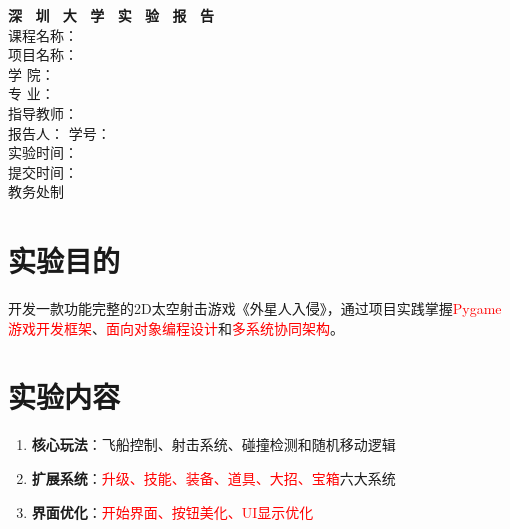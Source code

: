 \documentclass[a4paper,12pt]{article}
\begin{document}

\begin{titlepage}
    \centering
    \vspace*{2cm}
    \Huge{\textbf{深 \ 圳 \ 大 \ 学 \ 实 \ 验  \ 报 \ 告}}\\[1.5cm]
    
    \Large{课程名称：\underline{}}\\[0.5cm]
    \Large{项目名称：\underline{}}\\[0.5cm]
    \Large{学 \quad \quad 院：\underline{}}\\[0.5cm]
    \Large{专 \quad \quad 业：\underline{}}\\[0.5cm]
    \Large{指导教师：\underline{}}\\[0.5cm]
    \Large
    报告人：\underline{}%
    \hspace{0.5cm}%
    学号：\underline{}\\[0.5cm]
    \Large{实验时间：\underline{}}\\[0.5cm]
    \Large{提交时间：\underline{}}\\[1.5cm]
    \vfill
    \Large{教务处制}
\end{titlepage}

\newpage


\section{实验目的}

开发一款功能完整的2D太空射击游戏《外星人入侵》，通过项目实践掌握\textcolor{red}{Pygame游戏开发框架}、\textcolor{red}{面向对象编程设计}和\textcolor{red}{多系统协同架构}。

\section{实验内容}

\begin{enumerate}
    \item \textbf{核心玩法}：飞船控制、射击系统、碰撞检测和随机移动逻辑
    \item \textbf{扩展系统}：\textcolor{red}{升级、技能、装备、道具、大招、宝箱}六大系统
    \item \textbf{界面优化}：\textcolor{red}{开始界面、按钮美化、UI显示优化}
\end{enumerate}
\end{document}
